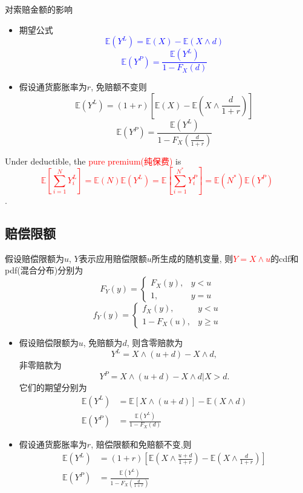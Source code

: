 \documentclass[professionalfont]{beamer}
\def\E{{\mathbb E}}  %
\newcommand{\red}[1]{\textcolor{red}{#1}}
\newcommand{\blue}[1]{\textcolor{blue}{#1}}
\begin{document}
\begin{frame}{对索赔金额的影响}
\begin{itemize}
	\item 期望公式
\blue{$$\E(Y^L)=\E(X)-\E(X\wedge d)$$
$$\E(Y^P)=\frac{\E(Y^L)}{1-F_X(d)}$$}
\item 
 假设通货膨胀率为$r$, 免赔额不变则
	$$\E(Y^L)=(1+r)\left[\E(X)-\E\left(X\wedge \frac{d}{1+r}\right)\right]$$
	$$\E(Y^P)=\frac{\E(Y^L)}{1-F_X\left(\frac{d}{1+r}\right)}$$
\end{itemize}
\end{frame}
\begin{frame}
	
{\center	Under deductible, the \red{pure premium(纯保费)} is \red{$$\E\left[\sum_{i=1}^{N}Y^L_i\right]=\E(N)\E(Y^L)=\E\left[\sum_{i=1}^{N^*}Y^P_i\right]=\E(N^*)\E(Y^P)$$}.}
\end{frame}
\subsection{赔偿限额}
\begin{frame}
	假设赔偿限额为$u$, $Y$表示应用赔偿限额$u$所生成的随机变量, 则\red{$Y=X\wedge u$}的cdf和pdf(混合分布)分别为
	\begin{equation*}
	F_Y(y)=
	\begin{cases}
	F_X(y), & y<u \\
	1, & y= u
	\end{cases}
	\end{equation*}
	\begin{equation*}
	f_Y(y)=
	\begin{cases}
	f_X(y), & y<u \\
	1-F_X(u), & y\geq u
	\end{cases}
	\end{equation*}
\end{frame}
\begin{frame}
\begin{itemize}
	\item	假设赔偿限额为$u$, 免赔额为$d$, 则含零赔款为$$Y^L=X\wedge(u+d)-X\wedge d,$$
	非零赔款为$$Y^P=X\wedge(u+d)-X\wedge d|X>d.$$ 它们的期望分别为
	\begin{align*}
	 \E(Y^L)&=\E\left[X\wedge(u+d)\right]-\E(X\wedge d) \\
	 \E(Y^P)&=\frac{\E(Y^L)}{1-F_X(d)}
	\end{align*}
	\item
	假设通货膨胀率为$r$, 赔偿限额和免赔额不变,则
	\begin{align*}
	\E(Y^L)&=(1+r)\left[\E\left(X\wedge\frac{u+d}{1+r}\right)-\E\left(X\wedge \frac{d}{1+r}\right)\right] \\
	\E(Y^P)&=\frac{\E(Y^L)}{1-F_X\left(\frac{d}{1+r}\right)}
	\end{align*}
\end{itemize}
\end{frame}
\end{document}
